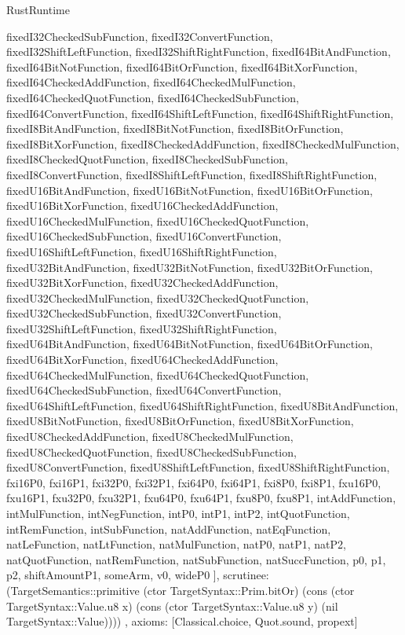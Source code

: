 \begin{lexlean}{RustRuntime}
\begin{semanticmodule}
{{      fixedI32CheckedSubFunction,
      fixedI32ConvertFunction,
      fixedI32ShiftLeftFunction,
      fixedI32ShiftRightFunction,
      fixedI64BitAndFunction,
      fixedI64BitNotFunction,
      fixedI64BitOrFunction,
      fixedI64BitXorFunction,
      fixedI64CheckedAddFunction,
      fixedI64CheckedMulFunction,
      fixedI64CheckedQuotFunction,
      fixedI64CheckedSubFunction,
      fixedI64ConvertFunction,
      fixedI64ShiftLeftFunction,
      fixedI64ShiftRightFunction,
      fixedI8BitAndFunction,
      fixedI8BitNotFunction,
      fixedI8BitOrFunction,
      fixedI8BitXorFunction,
      fixedI8CheckedAddFunction,
      fixedI8CheckedMulFunction,
      fixedI8CheckedQuotFunction,
      fixedI8CheckedSubFunction,
      fixedI8ConvertFunction,
      fixedI8ShiftLeftFunction,
      fixedI8ShiftRightFunction,
      fixedU16BitAndFunction,
      fixedU16BitNotFunction,
      fixedU16BitOrFunction,
      fixedU16BitXorFunction,
      fixedU16CheckedAddFunction,
      fixedU16CheckedMulFunction,
      fixedU16CheckedQuotFunction,
      fixedU16CheckedSubFunction,
      fixedU16ConvertFunction,
      fixedU16ShiftLeftFunction,
      fixedU16ShiftRightFunction,
      fixedU32BitAndFunction,
      fixedU32BitNotFunction,
      fixedU32BitOrFunction,
      fixedU32BitXorFunction,
      fixedU32CheckedAddFunction,
      fixedU32CheckedMulFunction,
      fixedU32CheckedQuotFunction,
      fixedU32CheckedSubFunction,
      fixedU32ConvertFunction,
      fixedU32ShiftLeftFunction,
      fixedU32ShiftRightFunction,
      fixedU64BitAndFunction,
      fixedU64BitNotFunction,
      fixedU64BitOrFunction,
      fixedU64BitXorFunction,
      fixedU64CheckedAddFunction,
      fixedU64CheckedMulFunction,
      fixedU64CheckedQuotFunction,
      fixedU64CheckedSubFunction,
      fixedU64ConvertFunction,
      fixedU64ShiftLeftFunction,
      fixedU64ShiftRightFunction,
      fixedU8BitAndFunction,
      fixedU8BitNotFunction,
      fixedU8BitOrFunction,
      fixedU8BitXorFunction,
      fixedU8CheckedAddFunction,
      fixedU8CheckedMulFunction,
      fixedU8CheckedQuotFunction,
      fixedU8CheckedSubFunction,
      fixedU8ConvertFunction,
      fixedU8ShiftLeftFunction,
      fixedU8ShiftRightFunction,
      fxi16P0,
      fxi16P1,
      fxi32P0,
      fxi32P1,
      fxi64P0,
      fxi64P1,
      fxi8P0,
      fxi8P1,
      fxu16P0,
      fxu16P1,
      fxu32P0,
      fxu32P1,
      fxu64P0,
      fxu64P1,
      fxu8P0,
      fxu8P1,
      intAddFunction,
      intMulFunction,
      intNegFunction,
      intP0,
      intP1,
      intP2,
      intQuotFunction,
      intRemFunction,
      intSubFunction,
      natAddFunction,
      natEqFunction,
      natLeFunction,
      natLtFunction,
      natMulFunction,
      natP0,
      natP1,
      natP2,
      natQuotFunction,
      natRemFunction,
      natSubFunction,
      natSuccFunction,
      p0,
      p1,
      p2,
      shiftAmountP1,
      someArm,
      v0,
      wideP0
    ],
    scrutinee: (TargetSemantics::primitive (ctor TargetSyntax::Prim.bitOr) (cons (ctor TargetSyntax::Value.u8 x) (cons (ctor TargetSyntax::Value.u8 y) (nil TargetSyntax::Value))))
  },
  axioms: [Classical.choice, Quot.sound, propext]
}


\end{semanticmodule}
\end{lexlean}
